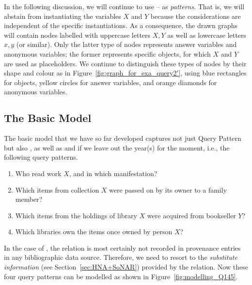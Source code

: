 In the following discussion, we will continue to use --
as \emph{patterns}. That is, we will abstain from instantiating the variables $X$ and $Y$
because the considerations are independent of the specific instantiations.
As a consequence, the drawn graphs will contain nodes labelled with uppercase letters $X,Y$
as well as lowercase letters $x,y$ (or similar).
Only the latter type of nodes represents answer variables and anonymous variables;
the former represents specific objects, for which $X$ and $Y$ are used as placeholders.
We continue to distinguish these types of nodes by their shape and colour as in Figure~\ref{fig:graph_for_exa_query2'},
using blue rectangles for objects, yellow circles for answer variables, and orange diamonds 
for anonymous variables.

\subsection{The Basic Model}

The basic model that we have so far developed captures not just Query Pattern~
but also , as well as  and  if we leave out the year(s) for the moment, i.e.,
the following query patterns.
%
\begin{enumerate}
  \item[\exaquery{1$^-$}]
    Who read
    work $X$, and
    in which manifestation?
  \item[\exaquery{4\phantom{$^-$}}]
    Which items from collection $X$ were passed on by its owner to a family member?
  \item[\exaquery{5$^-$}]
    Which items from the holdings of library $X$ were acquired from bookseller $Y$?
  \item[\exaquery{8}\phantom{$^-$}]
    Which libraries own the items once owned by person $X$?
\end{enumerate}
%
In the case of , the relation  is most certainly not recorded in provenance entries
in any bibliographic data source. Therefore, we need to resort to the \emph{substitute information}
(see Section~\ref{sec:HNA+SoNAR}) provided by the  relation.
Now these four query patterns
can be modelled as shown in Figure~\ref{fig:modelling_Q145}.

